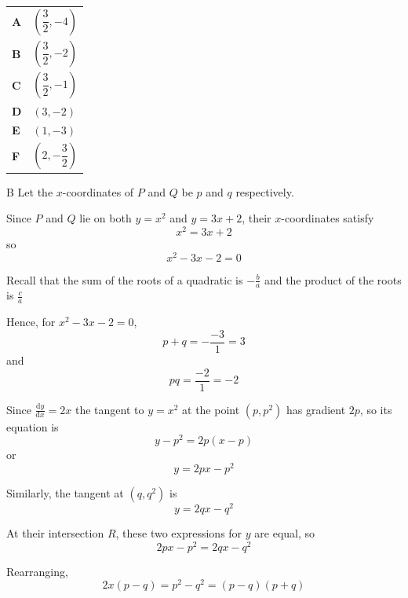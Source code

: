 \documentclass[11pt,a4paper]{article}
\begin{document}
\begin{enumerate}[label=\textbf{\arabic*.},leftmargin=*,itemsep=0pt,start=8]
\begin{center}
\end{center}

\par\vspace*{12pt}
\begin{tabularx}{\linewidth}{@{}>{\bfseries}l Y@{}}
A &
$\left(\dfrac{3}{2},-4\right)$
\\[0.8em]
B &
$\left(\dfrac{3}{2},-2\right)$
\\[0.8em]
C &
$\left(\dfrac{3}{2},-1\right)$
\\[0.8em]
D &
$\left(3,-2\right)$
\\[0.8em]
E &
$\left(1,-3\right)$
\\[0.8em]
F &
$\left(2,-\dfrac{3}{2}\right)$
\\
\end{tabularx}

\begin{djsSolution}{B}
Let the $x$-coordinates of $P$ and $Q$ be $p$ and $q$ respectively.

Since $P$ and $Q$ lie on both $y=x^2$ and $y=3x+2$, their $x$-coordinates satisfy
\[
x^2=3x+2
\]
so
\[
x^2-3x-2=0
\]

Recall that the sum of the roots of a quadratic is
\(
-\tfrac{b}{a}
\)
and the product of the roots is
\(
\tfrac{c}{a}
\)

Hence, for $x^2-3x-2=0$,
\[
p+q=-\frac{-3}{1}=3
\]
and
\[
pq=\frac{-2}{1}=-2
\]

Since $\frac{\mathrm{d}y}{\mathrm{d}x}=2x$ the tangent to $y=x^2$ at the point $(p,p^2)$ has gradient $2p$, so its equation is
\[
y-p^2=2p(x-p)
\]
or
\[
y=2px-p^2
\]

Similarly, the tangent at $(q,q^2)$ is
\[
y=2qx-q^2
\]

At their intersection $R$, these two expressions for $y$ are equal, so
\[
2px-p^2=2qx-q^2
\]

Rearranging,
\[
2x(p-q)=p^2-q^2=(p-q)(p+q)
\]


\end{djsSolution}
\end{enumerate}
\end{document}
